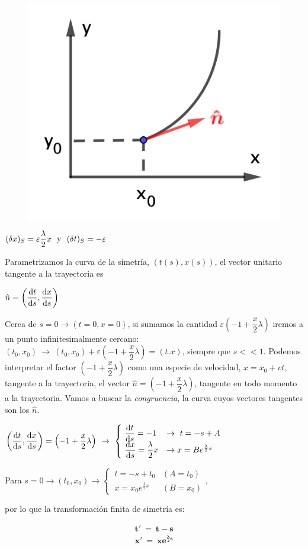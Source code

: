 \begin{adjustwidth}{20pt}{20pt}

	\begin{multicols}{2}
	\begin{figure}[H]
	\centering
	\includegraphics[width=.3\textwidth]{imagenes/img17-01.png}
	\end{figure}
	$(\var x)_S=\varepsilon \dfrac \lambda 2 x \ \text{ y } \ (\var t)_S=-\varepsilon$
	
	Parametrizamos la curva de la simetría, $(t(s),x(s))$, el vector unitario tangente a la trayectoria es 
	
	$\hat n=\left( \displaystyle \dv{t}{s}, \dv{x}{s} \right)$
	\end{multicols}
	Cerca de $s=0 \to (t=0,x=0)$, si sumamos la cantidad $\varepsilon \left(-1+\dfrac x 2 \lambda \right)$ iremos a un punto infinitesimalmente cercano: $(t_0,x_0) \ \to \ (t_0,x_0)+\varepsilon \left(-1+\dfrac x 2 \lambda \right)=(t.x)$, siempre que $s<<1$. Podemos interpretar el factor $\left(-1+\dfrac x 2 \lambda \right)$ como una especie de velocidad, $x=x_0+vt$, tangente a la trayectoria, el vector $\hat n=\left(-1+\dfrac x 2 \lambda \right)$, tangente en todo momento a la trayectoria.
	Vamos a buscar la \emph{congruencia}, la curva cuyos vectores tangentes son los $\hat n$.
	
	$\displaystyle \left(\dv{t}{s}, \dv{x}{s} \right)=\left(-1+\dfrac x 2 \lambda \right) \ \to \ \begin{cases}
 		\ \displaystyle \dv{t}{s}=-1 &\to \ t=-s+A \\
 		\ \displaystyle \dv{x}{s}=\dfrac \lambda 2 x &\to x=Be^{\frac \lambda 2 s} \end{cases}$
 		
 	Para $s=0 \to (t_0,x_0) \to \begin{cases} \ t=-s+t_0 & (A=t_0) \\ \ x=x_0e^{\frac \lambda 2 s} &(B=x_0)  \end{cases}$, 
 	
 	por lo que la transformación finita de simetría es:
 	
 	$$\boldsymbol{ \boxed{ \ \begin{matrix} t' \ = \ t - s \\ x'\ = \ x e^{\frac \lambda 2 s} \end{matrix} \ } }$$	
 
\end{adjustwidth}



